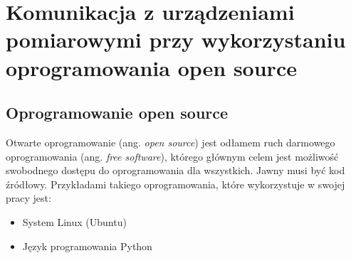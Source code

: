 \chapter{Komunikacja z urządzeniami pomiarowymi przy wykorzystaniu oprogramowania open source}
\section{Oprogramowanie open source}
Otwarte oprogramowanie (ang. \textit{open source}) jest odłamem ruch darmowego oprogramowania (ang. \textit{free software}),
którego głównym celem jest możliwość swobodnego dostępu do oprogramowania dla wszystkich. Jawny musi być kod źródłowy.
Przykładami takiego oprogramowania, które wykorzystuje w swojej pracy jest:
\begin{itemize}
\item System Linux (Ubuntu)
\item Język programowania Python
\end{itemize}
